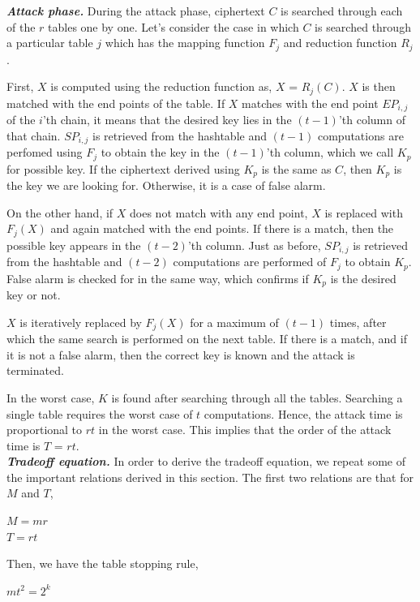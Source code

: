 \noindent \textit{\textbf{Attack phase.}} During the attack phase, ciphertext $C$ is searched through each of the $r$ tables one by one. Let's consider the case in which $C$ is searched through a particular table $j$ which has the mapping function $F_j$ and reduction function $R_j$. 

First, $X$ is computed using the reduction function as, $X$ = $R_j(C)$. $X$ is then matched with the end points of the table. If $X$ matches with the end point $EP_{i,j}$ of the $i$'th chain, it means that the desired key lies in the $(t-1)$'th column of that chain. $SP_{i,j}$ is retrieved from the hashtable and $(t-1)$ computations are perfomed using $F_j$ to obtain the key in the $(t-1)$'th column, which we call $K_p$ for possible key. If the ciphertext derived using $K_p$ is the same as $C$, then $K_p$ is the key we are looking for. Otherwise, it is a case of false alarm. 

On the other hand, if $X$ does not match with any end point, $X$ is replaced with $F_j(X)$ and again matched with the end points. If there is a match, then the possible key appears in the $(t-2)$'th column. Just as before, $SP_{i,j}$ is retrieved from the hashtable and $(t-2)$ computations are performed of $F_j$ to obtain $K_p$. False alarm is checked for in the same way, which confirms if $K_p$ is the desired key or not. 

$X$ is iteratively replaced by $F_j(X)$ for a maximum of $(t-1)$ times, after which the same search is performed on the next table. If there is a match, and if it is not a false alarm, then the correct key is known and the attack is terminated. 

In the worst case, $K$ is found after searching through all the tables. Searching a single table requires the worst case of $t$ computations. Hence, the attack time is proportional to $rt$ in the worst case. This implies that the order of the attack time is $T$ = $rt$.\\

\noindent \textit{\textbf{Tradeoff equation.}} In order to derive the tradeoff equation, we repeat some of the important relations derived in this section. The first two relations are that for $M$ and $T$, 

\begin{center}
$M = mr$\\
$T = rt$\\
\end{center}

Then, we have the table stopping rule,
\begin{center}
$mt^2 = 2^k$\\
\end{center}

